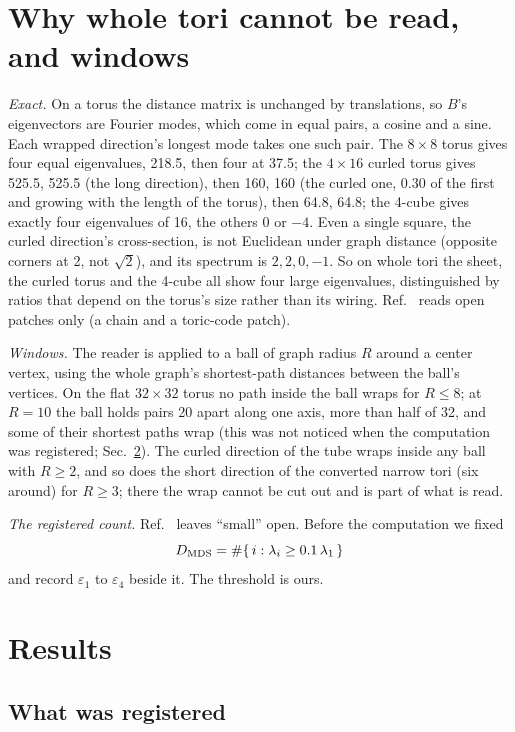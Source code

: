 \documentclass[aps,pre,10pt,twocolumn,superscriptaddress,nofootinbib]{revtex4-2}
\begin{document}
\section{Why whole tori cannot be read, and windows}
\label{sec:windows}

\emph{Exact.} On a torus the distance matrix is unchanged by translations, so $B$'s eigenvectors are Fourier modes,
which come in equal pairs, a cosine and a sine. Each wrapped direction's longest mode takes one such pair. The
$8\times8$ torus gives four equal eigenvalues, 218.5, then four at 37.5; the $4\times16$ curled torus gives 525.5,
525.5 (the long direction), then 160, 160 (the curled one, 0.30 of the first and growing with the length of the
torus), then 64.8, 64.8; the 4-cube gives exactly four eigenvalues of 16, the others 0 or $-4$. Even a single square,
the curled direction's cross-section, is not Euclidean under graph distance (opposite corners at 2, not $\sqrt2$),
and its spectrum is $2,2,0,-1$. So on whole tori the sheet, the curled torus and the 4-cube all show four large
eigenvalues, distinguished by ratios that depend on the torus's size rather than its wiring. Ref.~\cite{CCM16}
reads open patches only (a chain and a toric-code patch).

\emph{Windows.} The reader is applied to a ball of graph radius $R$ around a center vertex, using the whole graph's
shortest-path distances between the ball's vertices. On the flat $32\times32$ torus no path inside the ball wraps
for $R\le8$; at $R=10$ the ball holds pairs 20 apart along one axis, more than half of 32, and some of their shortest
paths wrap (this was not noticed when the computation was registered; Sec.~\ref{sec:results}). The curled direction
of the tube wraps inside any ball with $R\ge2$, and so does the short direction of the converted narrow tori (six
around) for $R\ge3$; there the wrap cannot be cut out and is part of what is read.

\emph{The registered count.} Ref.~\cite{CCM16} leaves ``small'' open. Before the computation we fixed
\[
D_{\rm MDS}=\#\{\,i:\lambda_i\ge0.1\,\lambda_1\,\}
\]
and record $\varepsilon_1$ to $\varepsilon_4$ beside it. The threshold is ours.

\section{Results}
\label{sec:results}

\subsection{What was registered}
\end{document}
